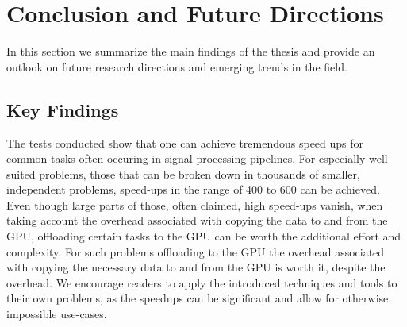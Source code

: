 \documentclass[english,11pt,a4paper,table]{article} %
\let\stdsection\section %
\renewcommand\section{\clearpage\newpage\stdsection} %
\begin{document}
\begin{comment}
\subsection{Results on cloud machines}

In order to test the tool on a wider variety of hardware we also ran the benchmarking tool on a variety of cloud machines with a selection of popular Nvidia GPUs (A100, V100, P6000) to cover the high-end models of recent architectures (Ampere, Volta and Pascal respectively), which are commonly found in high performance computing environments.
The most recent iteration of Nvidia's GPU architecture, Hopper, which is currently only available on H100 systems was ommited, due to the lack of availability of such systems on the cloud.

This test is especially insightful, since it allows us to draw conclusions about the benefit of faster, more expensive GPUs, in a setting which is bottlenecked by the memory bandwidth of the GPU and the PCI-E bus.

Of course one must not overlook that such GPUs with significantly more dedicated memory (up to 80 GB on the A100) would allow for different workflows, where the data (or multiple copies of the data in different stages of a signal processing pipeline) can be kept on the GPU, instead of being transferred back and forth between the CPU and the GPU.
\end{comment}

\section{Conclusion and Future Directions}
In this section we summarize the main findings of the thesis and provide an outlook on future research directions and emerging trends in the field.

\subsection{Key Findings}
The tests conducted show that one can achieve tremendous speed ups for common tasks often occuring in signal processing pipelines.
For especially well suited problems, those that can be broken down in thousands of smaller, independent problems, speed-ups in the range of 400 to 600 can be achieved.
Even though large parts of those, often claimed, high speed-ups vanish, when taking account the overhead associated with copying the data to and from the GPU, offloading certain tasks to the GPU can be worth the additional effort and complexity.
For such problems offloading to the GPU the overhead associated with copying the necessary data to and from the GPU is worth it, despite the overhead.
We encourage readers to apply the introduced techniques and tools to their own problems, as the speedups can be significant and allow for otherwise impossible use-cases.
\end{document}

